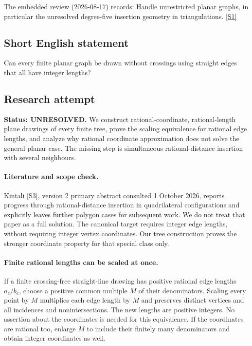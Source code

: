 \documentclass[11pt,a4paper]{article}
\newcommand{\sref}[2]{\hyperlink{source:#1:#2}{[S#2]}}
\begin{document}
The embedded review (2026-08-17) records: Handle unrestricted planar graphs, in particular the unresolved degree-five insertion geometry in triangulations. \sref{statement}{1}

\subsection{Short English statement}

Can every finite planar graph be drawn without crossings using straight edges that all have integer lengths?

\subsection{Research attempt}
\textbf{Status: UNRESOLVED.} We construct rational-coordinate, rational-length plane drawings of every finite tree, prove the scaling equivalence for rational edge lengths, and analyze why rational coordinate approximation does not solve the general planar case. The missing step is simultaneous rational-distance insertion with several neighbours.

\paragraph{Literature and scope check.}
Kintali [S3], version 2 primary abstract consulted 1 October 2026, reports progress through rational-distance insertion in quadrilateral configurations and explicitly leaves further polygon cases for subsequent work. We do not treat that paper as a full solution. The canonical target requires integer edge lengths, without requiring integer vertex coordinates. Our tree construction proves the stronger coordinate property for that special class only.

\paragraph{Finite rational lengths can be scaled at once.}
If a finite crossing-free straight-line drawing has positive rational edge lengths $a_e/b_e$, choose a positive common multiple $M$ of their denominators. Scaling every point by $M$ multiplies each edge length by $M$ and preserves distinct vertices and all incidences and nonintersections. The new lengths are positive integers. No assertion about the coordinates is needed for this equivalence. If the coordinates are rational too, enlarge $M$ to include their finitely many denominators and obtain integer coordinates as well.
\end{document}
